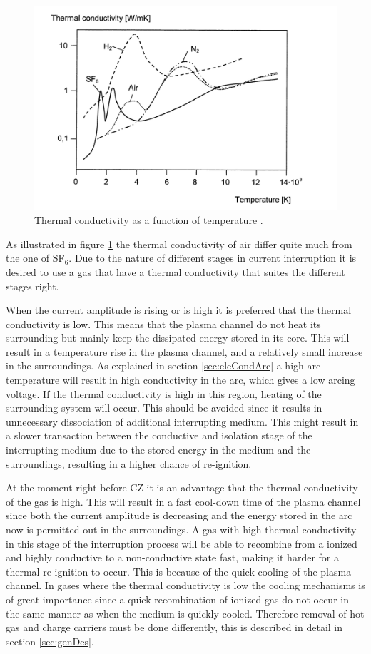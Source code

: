 \documentclass[10pt,a4paper,twoside]{article}
\begin{document}
\begin{figure}[H]
\centering
\includegraphics[scale=0.8]{Bilder/Theory/thermalCond.png}
\caption{Thermal conductivity as a function of temperature \cite{bib:HVEbreak}.} \label{fig:tempConGas}
\end{figure}

As illustrated in figure \ref{fig:tempConGas} the thermal conductivity of air differ quite much from the one of SF$_6$. Due to the nature of different stages in current interruption it is desired to use a gas that have a thermal conductivity that suites the different stages right. 

When the current amplitude is rising or is high it is preferred that the thermal conductivity is low. This means that the plasma channel do not heat its surrounding but mainly keep the dissipated energy stored in its core. This will result in a temperature rise in the plasma channel, and a relatively small increase in the surroundings. As explained in section \ref{sec:eleCondArc} a high arc temperature will result in high conductivity in the arc, which gives a low arcing voltage. If the thermal conductivity is high in this region, heating of the surrounding system will occur. This should be avoided since it results in unnecessary dissociation of additional interrupting medium. This might result in a slower transaction between the conductive and isolation stage of the interrupting medium due to the stored energy in the medium and the surroundings, resulting in a higher chance of re-ignition.

At the moment right before CZ it is an advantage that the thermal conductivity of the gas is high. This will result in a fast cool-down time of the plasma channel since both the current amplitude is decreasing and the energy stored in the arc now is permitted out in the surroundings. A gas with high thermal conductivity in this stage of the interruption process will be able to recombine from a ionized and highly conductive to a non-conductive state fast, making it harder for a thermal re-ignition to occur. This is because of the quick cooling of the plasma channel. In gases where the thermal conductivity is low the cooling mechanisms is of great importance since a quick recombination of ionized gas do not occur in the same manner as when the medium is quickly cooled. Therefore removal of hot gas and charge carriers must be done differently, this is described in detail in section \ref{sec:genDes}.
\end{document}
